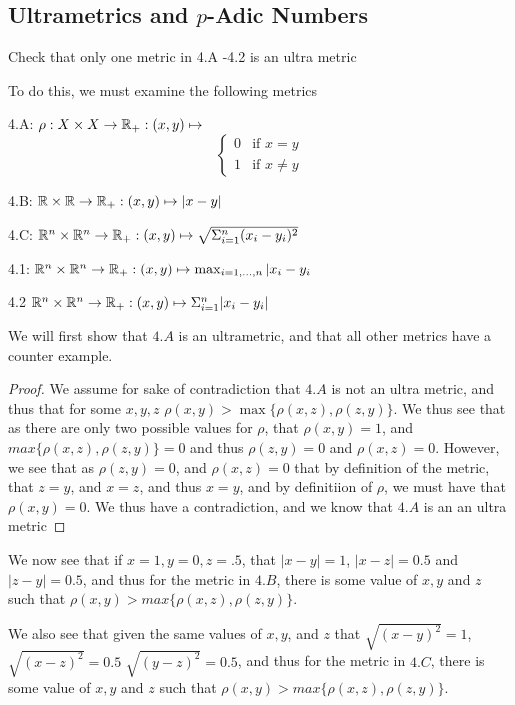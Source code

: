 \subsection{Ultrametrics and $p$-Adic Numbers}

\begin{majorEx}%
  Check that only one metric in 4.A -4.2 is an ultra metric
\end{majorEx}

To do this, we must examine the following metrics

4.A:
$\rho: X\times X \rightarrow \mathbb{R}_+: (x,y) \mapsto $
\[ \begin{cases} 
    0 & \text{if } x=y \\
    1 & \text{if } x \neq y 
  \end{cases}
  \]

4.B: $\mathbb{R} \times \mathbb{R} \rightarrow \mathbb{R}_+ :(x,y) \mapsto |x-y|$

4.C: $\mathbb{R}^n \times \mathbb{R}^n \rightarrow \mathbb{R}_+ : (x,y) \mapsto \sqrt{\Sigma_{i=1}^n (x_i-y_i)^2}$

4.1: $\mathbb{R}^n \times \mathbb{R}^n \rightarrow \mathbb{R}_+ : (x,y) \mapsto \max_{i=1,...,n}|x_i-y_i$ 

4.2 $\mathbb{R}^n \times \mathbb{R}^n \rightarrow \mathbb{R}_+ : (x,y) \mapsto \Sigma_{i=1}^n |x_i - y_i|$

We will first show that $4.A$ is an ultrametric, and that all other metrics have a counter example.

\begin{proof}
  We assume for sake of contradiction that $4.A$ is not an ultra metric, and thus 
  that for some $x,y,z$ $\rho(x,y) > \max \{\rho(x,z) , \rho(z,y)\}$. We thus see 
  that as there are only two possible values for $\rho$, that $\rho(x,y)=1$, and 
  $max \{\rho(x,z) , \rho(z,y)\}=0$ and thus $\rho(z,y)=0$ and $\rho(x,z)=0$. 
  However, we see that as $\rho(z,y)=0$, and $\rho(x,z)=0$ that by definition of 
  the metric, that $z=y$, and $x=z$, and thus $x=y$, and by definitiion of $\rho$, we must have that $\rho(x,y)=0$. We thus have a contradiction, and we know that $4.A$ is an an ultra metric
\end{proof}

We now see that if $x=1,y=0, z=.5$, that $|x-y|= 1$, $|x-z|=0.5$ and $|z-y|=0.5$, and thus for the metric in $4.B$, there is some value of $x,y$ and $z$ such that
$\rho(x,y) > max \{\rho(x,z) , \rho(z,y)\}$.

We also see that given the same values of $x,y$, and $z$ that
$\sqrt{(x-y)^2}=1$, $\sqrt{(x-z)^2}= 0.5$ $\sqrt{(y-z)^2}= 0.5$, and
thus for the metric in $4.C$, there is some value of $x,y$ and $z$ such that
$\rho(x,y) > max \{\rho(x,z) , \rho(z,y)\}$.

